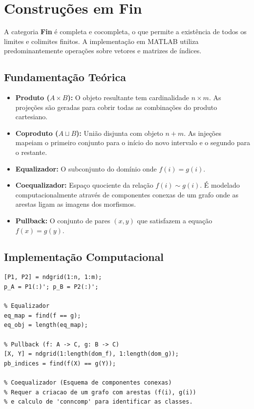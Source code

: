\section{Construções em Fin}

A categoria \textbf{Fin} é completa e cocompleta, o que permite a existência de todos os limites e colimites finitos. A implementação em MATLAB utiliza predominantemente operações sobre vetores e matrizes de índices.

\subsection{Fundamentação Teórica}
\begin{itemize}
    \item \textbf{Produto ($A \times B$):} O objeto resultante tem cardinalidade $n \times m$. As projeções são geradas para cobrir todas as combinações do produto cartesiano.
    \item \textbf{Coproduto ($A \sqcup B$):} União disjunta com objeto $n + m$. As injeções mapeiam o primeiro conjunto para o início do novo intervalo e o segundo para o restante.
    \item \textbf{Equalizador:} O subconjunto do domínio onde $f(i) = g(i)$.
    \item \textbf{Coequalizador:} Espaço quociente da relação $f(i) \sim g(i)$. É modelado computacionalmente através de componentes conexas de um grafo onde as arestas ligam as imagens dos morfismos.
    \item \textbf{Pullback:} O conjunto de pares $(x, y)$ que satisfazem a equação $f(x) = g(y)$.
\end{itemize}

\subsection{Implementação Computacional}
\begin{lstlisting}[caption={Construções Universais em Fin}]
% Produto e Projeções
[P1, P2] = ndgrid(1:n, 1:m);
p_A = P1(:)'; p_B = P2(:)'; 

% Equalizador
eq_map = find(f == g);
eq_obj = length(eq_map);

% Pullback (f: A -> C, g: B -> C)
[X, Y] = ndgrid(1:length(dom_f), 1:length(dom_g));
pb_indices = find(f(X) == g(Y));

% Coequalizador (Esquema de componentes conexas)
% Requer a criacao de um grafo com arestas (f(i), g(i))
% e calculo de 'conncomp' para identificar as classes.
\end{lstlisting}